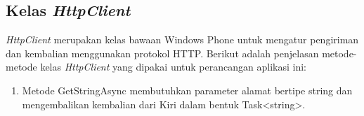 \subsection{Kelas \textit{HttpClient}}
\label{lab:Kelas HttpClient}
\hspace{0.5cm} \textit{HttpClient} merupakan kelas bawaan Windows Phone untuk mengatur pengiriman dan kembalian menggunakan protokol HTTP. Berikut adalah penjelasan metode-metode kelas \textit{HttpClient} yang dipakai untuk perancangan aplikasi ini:
\begin{enumerate}
	\item Metode GetStringAsync membutuhkan parameter alamat bertipe string dan mengembalikan kembalian dari Kiri dalam bentuk Task<string>.
\end{enumerate}

